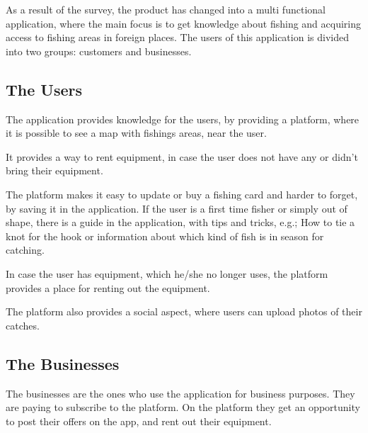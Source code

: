 As a result of the survey, the product has changed into a multi functional application, where the main focus is to get knowledge about fishing and acquiring access to fishing areas in foreign places. 
The users of this application is divided into two groups: customers and businesses. 

\subsection{The Users}
The application provides knowledge for the users, by providing a platform, where it is possible to see a map with fishings areas, near the user.

It provides a way to rent equipment, in case the user does not have any or didn’t bring their equipment. 

The platform makes it easy to update or buy a fishing card and harder to forget, by saving it in the application. If the user is a first time fisher or simply out of shape, there is a guide in the application, with tips and tricks, e.g.; How to tie a knot for the hook or information about which kind of fish is in season for catching. 

In case the user has equipment, which he/she no longer uses, the platform provides a place for renting out the equipment.

The platform also provides a social aspect, where users can upload photos of their catches. 


\subsection{The Businesses} 
The businesses are the ones who use the application for business purposes. They are paying to subscribe to the platform. On the platform they get an opportunity to post their offers on the app, and rent out their equipment.

